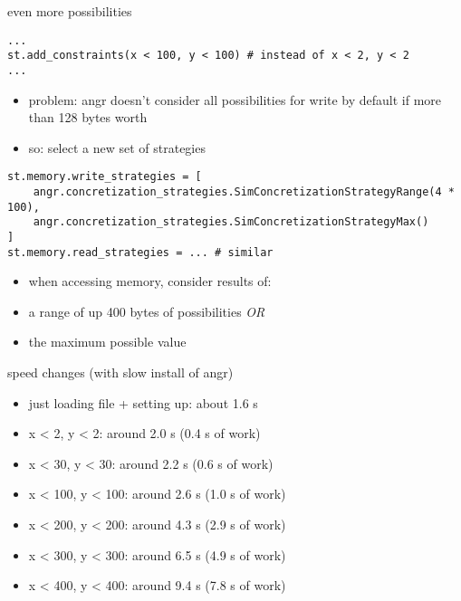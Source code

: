 \begin{frame}[fragile]{even more possibilities}
\begin{Verbatim}[fontsize=\fontsize{9}{10}]
...
st.add_constraints(x < 100, y < 100) # instead of x < 2, y < 2
...
\end{Verbatim}
\begin{itemize}
\item problem: angr doesn't consider all possibilities for write by default if more
    than 128 bytes worth
\item so: select a new set of strategies
\end{itemize}
\begin{Verbatim}[fontsize=\fontsize{8}{9}]
st.memory.write_strategies = [
    angr.concretization_strategies.SimConcretizationStrategyRange(4 * 100),
    angr.concretization_strategies.SimConcretizationStrategyMax()
]
st.memory.read_strategies = ... # similar
\end{Verbatim}
\begin{itemize}
\item when accessing memory, consider results of:
\item a range of up 400 bytes of possibilities \textit{OR}
\item the maximum possible value
\end{itemize}
\end{frame}

\begin{frame}{speed changes (with slow install of angr)}
\begin{itemize}
\item just loading file + setting up: about 1.6 s
\item x < 2, y < 2: around 2.0 s (0.4 s of work)
\item x < 30, y < 30: around 2.2 s (0.6 s of work)
\item x < 100, y < 100: around 2.6 s (1.0 s of work)
\item x < 200, y < 200: around 4.3 s (2.9 s of work)
\item x < 300, y < 300: around 6.5 s (4.9 s of work)
\item x < 400, y < 400: around 9.4 s (7.8 s of work)
\end{itemize}
\end{frame}


